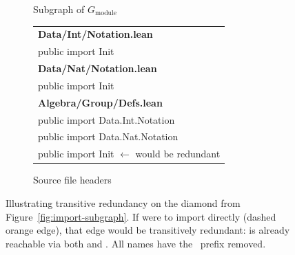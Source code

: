 \begin{figure}[H]
\centering
\begin{subfigure}[t]{0.42\textwidth}
\centering
\vspace{0pt}
\caption{Subgraph of $G_{\mathrm{module}}$}
\label{fig:tr-graph}
\end{subfigure}%
\hfill
\begin{subfigure}[t]{0.46\textwidth}
\vspace{0pt}\raggedleft
\scriptsize\ttfamily
\begin{tabular}[t]{@{}l@{}}
  \textnormal{\sffamily\bfseries\color{blue!60!black} Data/Int/Notation.lean} \\[1pt]
  \hspace{1em}public import \textcolor{blue!60!black}{Init} \\[6pt]
  \textnormal{\sffamily\bfseries\color{blue!60!black} Data/Nat/Notation.lean} \\[1pt]
  \hspace{1em}public import \textcolor{blue!60!black}{Init} \\[6pt]
  \textnormal{\sffamily\bfseries\color{blue!60!black} Algebra/Group/Defs.lean} \\[1pt]
  \hspace{1em}public import \textcolor{blue!60!black}{Data.Int.Notation} \\
  \hspace{1em}public import \textcolor{blue!60!black}{Data.Nat.Notation} \\
  \hspace{1em}\textcolor{orange!80!red}{public import \textcolor{blue!60!black}{Init}}
    \textnormal{\sffamily\color{orange!80!red} $\leftarrow$ would be redundant} \\
\end{tabular}
\caption{Source file headers}
\label{fig:tr-source}
\end{subfigure}
\caption{Illustrating transitive redundancy on the diamond from Figure~\ref{fig:import-subgraph}. If  were to import  directly (\textcolor{orange!80!red}{dashed orange} edge), that edge would be transitively redundant:  is already reachable via both  and . All names have the \ prefix removed.}
\label{fig:transitive-reduction}
\end{figure}


